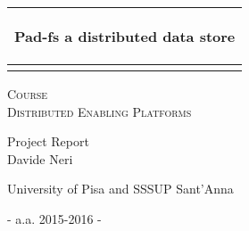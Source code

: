 %
%
%
%
%
\begin{titlepage}
  \addtolength{\hoffset}{0.5\evensidemargin-0.5\oddsidemargin} %
  \noindent%
  \begin{tabular}{@{}p{\textwidth}@{}}
    \toprule[2pt]
    \midrule
    \vspace{0.2cm}
    \begin{center}
    \Huge{\textbf{
      Pad-fs a distributed data store %
    }
    }
    \end{center}
   
    \vspace{0.2cm}\\
    \midrule
    \toprule[2pt]
    
    \vspace{2cm}\\
  \end{tabular}
  \begin{center}
  \textsc{Course}\\[0.5cm]
    \textsc{\Large Distributed Enabling Platforms}\\[2.5cm]
  
  \end{center}
  	
  \vspace{4 cm}
  \begin{center}
    {\large
      Project Report%
    }\\
    \vspace{0.2cm}
    {\Large
      Davide Neri%
    }
  \end{center}
  \vfill
  \begin{center}
   \Large{University of Pisa and SSSUP Sant'Anna}
  \end{center}
  \begin{center}
      \large{
        - a.a. 2015-2016 -%
        }
    \end{center}
\end{titlepage}
\clearpage